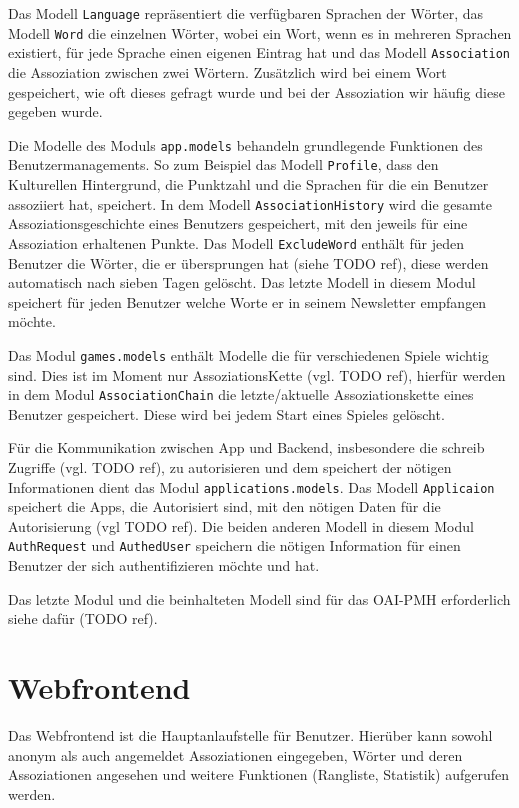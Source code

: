 Das Modell \texttt{Language} repräsentiert die verfügbaren Sprachen der Wörter, das Modell \texttt{Word} die einzelnen Wörter, wobei ein Wort, wenn es in mehreren Sprachen existiert, für jede Sprache einen eigenen Eintrag hat und das Modell \texttt{Association} die Assoziation zwischen zwei Wörtern. Zusätzlich wird bei einem Wort gespeichert, wie oft dieses gefragt wurde und bei der Assoziation wir häufig diese gegeben wurde.

Die Modelle des Moduls \texttt{app.models} behandeln grundlegende Funktionen des Benutzermanagements. So zum Beispiel das Modell \texttt{Profile}, dass den Kulturellen Hintergrund, die Punktzahl und die Sprachen für die ein Benutzer assoziiert hat, speichert. In dem Modell \texttt{AssociationHistory} wird die gesamte Assoziationsgeschichte eines Benutzers gespeichert, mit den jeweils für eine Assoziation erhaltenen Punkte. Das Modell \texttt{ExcludeWord} enthält für jeden Benutzer die Wörter, die er übersprungen hat (siehe TODO ref), diese werden automatisch nach sieben Tagen gelöscht. Das letzte Modell in diesem Modul speichert für jeden Benutzer welche Worte er in seinem Newsletter empfangen möchte.

Das Modul \texttt{games.models} enthält Modelle die für verschiedenen Spiele wichtig sind. Dies ist im Moment nur AssoziationsKette (vgl. TODO ref), hierfür werden in dem Modul \texttt{AssociationChain} die letzte/aktuelle Assoziationskette eines Benutzer gespeichert. Diese wird bei jedem Start eines Spieles gelöscht.

Für die Kommunikation zwischen App und Backend, insbesondere die schreib Zugriffe (vgl. TODO ref), zu autorisieren und dem speichert der nötigen Informationen dient das Modul \texttt{applications.models}. Das Modell \texttt{Applicaion} speichert die Apps, die Autorisiert sind, mit den nötigen Daten für die Autorisierung (vgl TODO ref). Die beiden anderen Modell in diesem Modul \texttt{AuthRequest} und \texttt{AuthedUser} speichern die nötigen Information für einen Benutzer der sich authentifizieren möchte und hat.

Das letzte Modul und die beinhalteten Modell sind für das OAI-PMH erforderlich siehe dafür (TODO ref).

\section{Webfrontend}
Das Webfrontend ist die Hauptanlaufstelle für Benutzer. Hierüber kann sowohl anonym als auch angemeldet Assoziationen eingegeben, Wörter und deren Assoziationen angesehen und weitere Funktionen (Rangliste, Statistik) aufgerufen werden.

